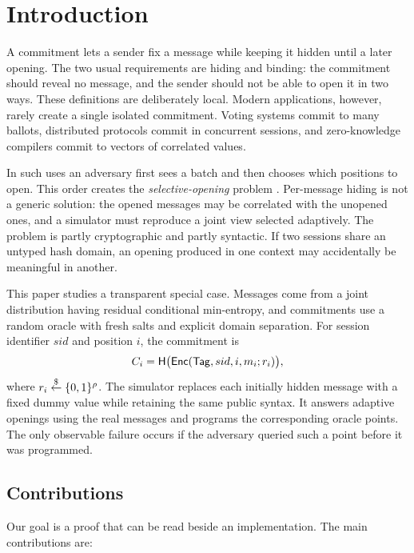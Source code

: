 \section{Introduction}
\label{sec:intro}

A commitment lets a sender fix a message while keeping it hidden until a later
opening.  The two usual requirements are hiding and binding: the commitment
should reveal no message, and the sender should not be able to open it in two
ways.  These definitions are deliberately local.  Modern applications,
however, rarely create a single isolated commitment.  Voting systems commit to
many ballots, distributed protocols commit in concurrent sessions, and
zero-knowledge compilers commit to vectors of correlated values.

In such uses an adversary first sees a batch and then chooses which positions
to open.  This order creates the \emph{selective-opening} problem
\cite{DworkEtAl2003,BellareHofheinzYilek2012}.  Per-message hiding is not a
generic solution: the opened messages may be correlated with the unopened
ones, and a simulator must reproduce a joint view selected adaptively.  The
problem is partly cryptographic and partly syntactic.  If two sessions share
an untyped hash domain, an opening produced in one context may accidentally be
meaningful in another.

This paper studies a transparent special case.  Messages come from a joint
distribution having residual conditional min-entropy, and commitments use a
random oracle with fresh salts and explicit domain separation.  For session
identifier $sid$ and position $i$, the commitment is
\begin{equation}
  C_i=\mathsf{H}\bigl(\mathsf{Enc}(\mathsf{Tag},sid,i,m_i;r_i)\bigr),
  \label{eq:intro-commitment}
\end{equation}
where $r_i\mathrel{\mathop{\leftarrow}\limits^{\$}}\{0,1\}^\rho$.  The simulator replaces each initially hidden
message with a fixed dummy value while retaining the same public syntax.  It
answers adaptive openings using the real messages and programs the
corresponding oracle points.  The only observable failure occurs if the
adversary queried such a point before it was programmed.

\subsection{Contributions}

Our goal is a proof that can be read beside an implementation.  The main
contributions are:

